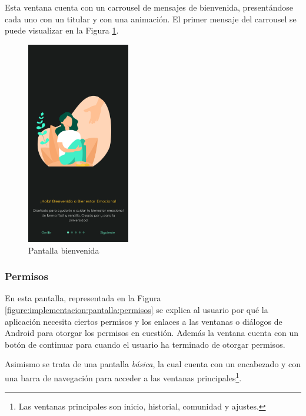                 Esta ventana cuenta con un carrousel de mensajes de bienvenida, presentándose cada uno con un titular y con una animación. El primer mensaje del carrousel se puede visualizar en la Figura \ref{figure:implementacion:pantalla:bienvenida}.
                
                \begin{figure}[h]
                	\centering
                	\includegraphics[width=0.4\textwidth]{figures/pantallas/Onboarding 1.png}
                	\caption{Pantalla bienvenida}
                	\label{figure:implementacion:pantalla:bienvenida}
                \end{figure}
                
                \clearpage  %
            \subsubsection*{Permisos}

                En esta pantalla, representada en la Figura \ref{figure:implementacion:pantalla:permisos} se explica al usuario por qué la aplicación necesita ciertos permisos y los enlaces a las ventanas o diálogos de Android para otorgar los permisos en cuestión. Además la ventana cuenta con un botón de continuar para cuando el usuario ha terminado de otorgar permisos.

                Asimismo se trata de una pantalla \textit{básica}, la cual cuenta con un encabezado y con una barra de navegación para acceder a las ventanas principales\footnote{Las ventanas principales son inicio, historial, comunidad y ajustes.}.
                
